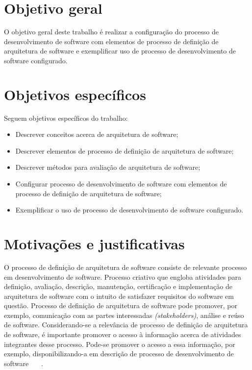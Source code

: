 \section{Objetivo geral}

O objetivo geral deste trabalho é realizar a  configuração do processo de desenvolvimento de software com elementos de processo de definição de arquitetura de software e exemplificar uso de processo de desenvolvimento de software configurado.

\section{Objetivos específicos}

Seguem objetivos específicos do trabalho:

\begin{itemize}
    \item Descrever conceitos acerca de arquitetura de software;
    \item Descrever elementos de processo de definição de arquitetura de software;
    \item Descrever métodos para avaliação de arquitetura de software;
    \item Configurar processo de desenvolvimento de software com elementos de processo de definição de arquitetura de software;
    \item Exemplificar o uso de processo de desenvolvimento de software configurado.
\end{itemize}

\section{Motivações e justificativas}

O processo de definição de arquitetura de software consiste de relevante processo em desenvolvimento de software. Processo criativo que engloba atividades para definição, avaliação, descrição, manutenção, certificação e implementação de arquitetura de software com o intuito de satisfazer requisitos do software em questão. Processo de definição de arquitetura de software pode promover, por exemplo, comunicação com as partes interessadas \emph{(stakeholders)}, análise e reúso de software. Considerando-se a relevância de processo de definição de arquitetura de software, é importante promover o acesso à informação acerca de atividades integrantes desse processo. Pode-se promover o acesso a essa informação, por exemplo, disponibilizando-a em descrição de processo de desenvolvimento de software  ~\cite{Sommerville_2011_texbook}~\cite{Swebok}~\cite{processo_criativo}.


